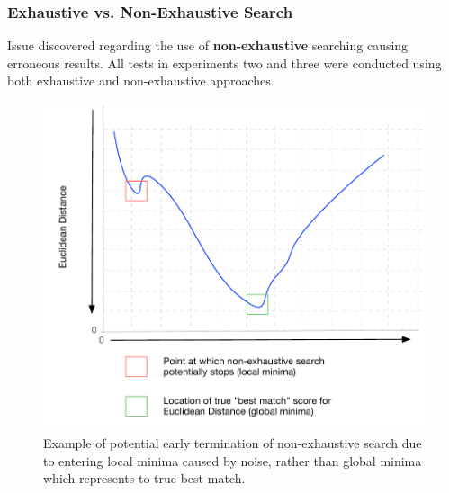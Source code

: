\documentclass[10pt, compress]{beamer}
\begin{document}
\begin{frame}[fragile]
  \frametitle{Exhaustive vs. Non-Exhaustive Search}
  
  \vspace{-10pt}
  
  Issue discovered regarding the use of \textbf{non-exhaustive} searching causing erroneous results. All tests in experiments two and three were conducted using both exhaustive and non-exhaustive approaches.
  
  \vspace{-10pt}

  \begin{figure}[ht!]
\centering
\includegraphics[scale=0.37]{ed}
 \vspace{-5pt}
\caption{Example of potential early termination of non-exhaustive search due to entering local minima caused by noise, rather than global minima which represents to true best match.}
\end{figure}

\end{frame}
\end{document}
